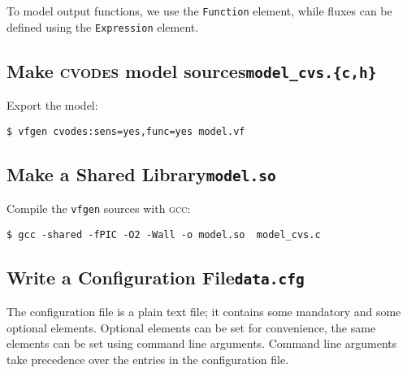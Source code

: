\documentclass[english,12pt]{scrartcl}
\begin{document}
To model output functions, we use the \texttt{Function} element, while
fluxes can be defined using the \texttt{Expression} element.

\subsection[make \textsc{cvodes} model sources]{Make \textsc{cvodes}
  model sources\hfill\texttt{model\_cvs.\{c,h\}}}
\label{sec:c}

Export the model:
\begin{verbatim}
$ vfgen cvodes:sens=yes,func=yes model.vf
\end{verbatim}

\subsection[make a shared library]{Make a Shared Library\hfill\texttt{model.so}}
\label{sec:so}

Compile the \texttt{vfgen} sources with \textsc{gcc}:
\begin{verbatim}
$ gcc -shared -fPIC -O2 -Wall -o model.so  model_cvs.c
\end{verbatim}

\subsection[write a configuration/data file]{Write a Configuration File\hfill\texttt{data.cfg}}
\label{sec:configuration}

The configuration file is a plain text file; it contains some
mandatory and some optional elements. Optional elements can be set for
convenience, the same elements can be set using command line
arguments. Command line arguments take precedence over the entries in
the configuration file.
\end{document}
